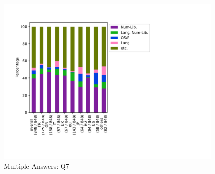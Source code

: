 \begin{figure}[htb]
\begin{center}
\includegraphics[width=14cm]{../pdfs/Q7-mans.pdf}
\caption{Multiple Answers: Q7}
\label{fig:Q7-mans}
\end{center}
\end{figure}
